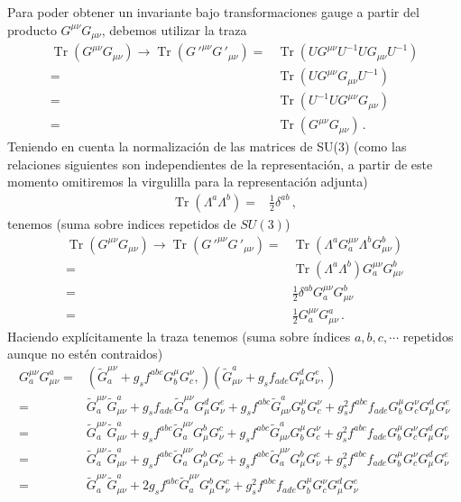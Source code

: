 \begin{frame}
Para poder obtener un invariante bajo transformaciones gauge a partir del producto $G^{\mu\nu}G_{\mu\nu}$, debemos utilizar la traza 
\begin{align}
  \operatorname{Tr}\left(G^{\mu\nu}G_{\mu\nu}\right)\to
  \operatorname{Tr}\left({G\,'}^{\mu\nu}{G\,'}_{\mu\nu}\right)
  =&\operatorname{Tr}\left(U{{G}}^{\mu\nu}U^{-1}U{{G}}_{\mu\nu}U^{-1}\right)\nonumber\\
  =&\operatorname{Tr}\left(U{{G}}^{\mu\nu}{{G}}_{\mu\nu}U^{-1}\right)\nonumber\\
  =&\operatorname{Tr}\left(U^{-1}U{{G}}^{\mu\nu}{{G}}_{\mu\nu}\right)\nonumber\\
  =&\operatorname{Tr}\left({{G}}^{\mu\nu}{{G}}_{\mu\nu}\right)\,.
\end{align}
Teniendo en cuenta la normalización de las matrices de SU(3) (como las relaciones siguientes son independientes de la representación, a partir de este momento omitiremos la virgulilla para la representación adjunta)
\begin{align}
   \operatorname{Tr}\left(\Lambda^a\Lambda^b\right)=&\frac{1}{2}\delta^{ab}\,,
\end{align}
tenemos (suma sobre indices repetidos de $SU(3)$)
\begin{align}
  \operatorname{Tr}\left(G^{\mu\nu}G_{\mu\nu}\right)\to
  \operatorname{Tr}\left({G\,'}^{\mu\nu}{G\,'}_{\mu\nu}\right)
  =&\operatorname{Tr}\left(\Lambda^a{G}^{\mu\nu}_a \Lambda^b{G}_{\mu\nu}^b\right)\nonumber\\
  =&\operatorname{Tr}\left(\Lambda^a \Lambda^b\right){G}^{\mu\nu}_a {G}_{\mu\nu}^b\nonumber\\
  =&\frac{1}{2}\delta^{a b}{G}^{\mu\nu}_a {G}_{\mu\nu}^b\nonumber\\
  =&\frac{1}{2}{G}^{\mu\nu}_a {G}_{\mu\nu}^a\,.
\end{align}
Haciendo explícitamente la traza tenemos (suma sobre índices $a,b,c,\cdots$ repetidos aunque no estén contraidos)
\begin{align}
  {G}^{\mu\nu}_a {G}_{\mu\nu}^a=&
\left( \widetilde{G}^{\mu\nu}_a+g_s f^{abc}G^\mu_b G^\nu_c, \right)
\left( \widetilde{G}_{\mu\nu}^a+g_s f_{ade}G_\mu^d G_\nu^e, \right) \nonumber\\
=&\widetilde{G}^{\mu\nu}_a\widetilde{G}_{\mu\nu}^a+g_s f_{ade}\widetilde{G}^{\mu\nu}_aG_\mu^d G_\nu^e
+g_s f^{abc}\widetilde{G}_{\mu\nu}^a G^\mu_b G^\nu_c +g_s^2 f^{abc}f_{ade}G^\mu_b G^\nu_c G_\mu^d G_\nu^e 
\nonumber\\
=&\widetilde{G}^{\mu\nu}_a\widetilde{G}_{\mu\nu}^a+g_s f^{abc}\widetilde{G}^{\mu\nu}_aG_\mu^b G_\nu^c
+g_s f^{abc}\widetilde{G}_{\mu\nu}^a G^\mu_b G^\nu_c +g_s^2 f^{abc}f_{ade}G^\mu_b G^\nu_c G_\mu^d G_\nu^e 
\nonumber\\
=&\widetilde{G}^{\mu\nu}_a\widetilde{G}_{\mu\nu}^a+g_s f^{abc}\widetilde{G}^{\mu\nu}_aG_\mu^b G_\nu^c
+g_s f^{abc}\widetilde{G}^{\mu\nu}_aG_\mu^b G_\nu^c +g_s^2 f^{abc}f_{ade}G^\mu_b G^\nu_c G_\mu^d G_\nu^e 
\nonumber\\
=&\widetilde{G}^{\mu\nu}_a\widetilde{G}_{\mu\nu}^a+2g_s f^{abc}\widetilde{G}^{\mu\nu}_aG_\mu^b G_\nu^c
+g_s^2 f^{abc}f_{ade}G^\mu_b G^\nu_c G_\mu^d G_\nu^e 
\end{align}


\end{frame}
